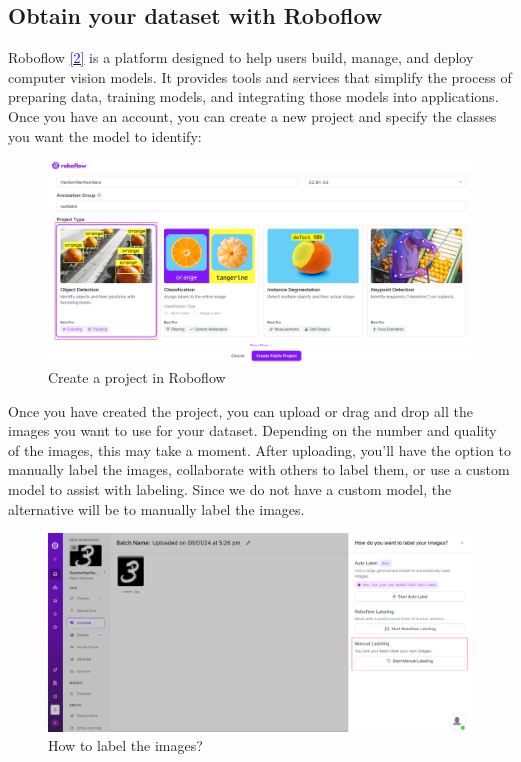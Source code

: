 \documentclass[../main]{subfiles}
\begin{document}
\subsection{Obtain your dataset with Roboflow}
Roboflow \hyperlink{target:zona}{\textcolor{blue}{[2]}} is a platform designed to help users build, manage, and deploy computer vision models. It provides tools and services that simplify the process of preparing data, training models, and integrating those models into applications. Once you have an account, you can create a new project and specify the classes you want the model to identify: \newpage
\begin{figure}[H]
   \centering
   \includegraphics[width=1\textwidth]{./figures/roboflowProject}
   \caption{Create a project in Roboflow}
 \label{fig:red}
\end{figure}
Once you have created the project, you can upload or drag and drop all the images you want to use for your dataset. Depending on the number and quality of the images, this may take a moment. After uploading, you'll have the option to manually label the images, collaborate with others to label them, or use a custom model to assist with labeling. Since we do not have a custom model, the alternative will be to manually label the images.
\begin{figure}[H]
    \centering
    \includegraphics[width=1\textwidth]{./figures/label}
    \caption{How to label the images?}
    \label{fig:red}
\end{figure}
\end{document}
